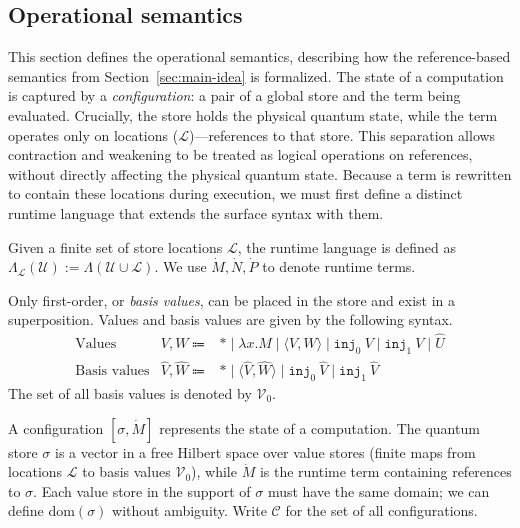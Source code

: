 \subsection{Operational semantics}
This section defines the operational semantics, describing how the reference-based semantics from Section~\ref{sec:main-idea} is formalized.
The state of a computation is captured by a \textit{configuration}: a pair of a global store and the term being evaluated.
Crucially, the store holds the physical quantum state, while the term operates only on locations ($\mathcal{L}$)---references to that store.
This separation allows contraction and weakening to be treated as logical operations on references, without directly affecting the physical quantum state.
Because a term is rewritten to contain these locations during execution, we must first define a distinct runtime language that extends the surface syntax with them.

\begin{dfn}
  Given a finite set of store locations $\mathcal{L}$, the runtime language is defined as $\Lambda_\mathcal{L}(\mathcal{U}) := \Lambda(\mathcal{U}\cup\mathcal{L})$.
  We use $\dot{M}, \dot{N}, \dot{P}$ to denote runtime terms.
\end{dfn}

Only first-order, or \textit{basis values}, can be placed in the store and exist in a superposition.
Values and basis values are given by the following syntax.
\begin{equation*}
  \begin{array}{lrl}
    \text{Values}       & V, W \Coloneqq             & *\mid\lambda x. M\mid\langle V, W\rangle\mid\texttt{inj}_0\ V\mid\texttt{inj}_1\ V\mid\hat{U} \\
    \text{Basis values} & \hat{V}, \hat{W} \Coloneqq & *\mid\langle\hat{V}, \hat{W}\rangle\mid\texttt{inj}_0\ \hat{V}\mid\texttt{inj}_1\ \hat{V}
  \end{array}
\end{equation*}
The set of all basis values is denoted by $\mathcal{V}_0$.

A configuration $[\sigma, \dot{M}]$ represents the state of a computation.
The quantum store $\sigma$ is a vector in a free Hilbert space over value stores (finite maps from locations $\mathcal{L}$ to basis values $\mathcal{V}_0$), while $\dot{M}$ is the runtime term containing references to $\sigma$.
Each value store in the support of $\sigma$ must have the same domain; we can define $\text{dom}(\sigma)$ without ambiguity.
Write $\mathcal{C}$ for the set of all configurations.

